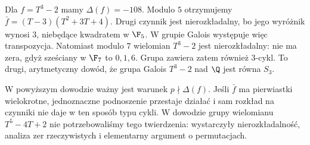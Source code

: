\begin{przyklad}
Dla $f=T^3-2$ mamy $\Delta(f)=-108$. Modulo $5$ otrzymujemy
$\bar f=(T-3)(T^2+3T+4)$. Drugi czynnik jest nierozkładalny, bo jego wyróżnik wynosi $3$, niebędące kwadratem w $\F_5$. W grupie Galois występuje więc transpozycja. Natomiast modulo $7$ wielomian $T^3-2$ jest nierozkładalny: nie ma zera, gdyż sześciany w $\F_7$ to $0,1,6$. Grupa zawiera zatem również $3$-cykl. To drugi, arytmetyczny dowód, że grupa Galois $T^3-2$ nad $\Q$ jest równa $S_3$.
\end{przyklad}

\begin{uwaga}
W powyższym dowodzie ważny jest warunek $p\nmid\Delta(f)$. Jeśli $\bar f$ ma pierwiastki wielokrotne, jednoznaczne podnoszenie przestaje działać i sam rozkład na czynniki nie daje w ten sposób typu cykli. W dowodzie grupy wielomianu $T^5-4T+2$ nie potrzebowaliśmy tego twierdzenia: wystarczyły nierozkładalność, analiza zer rzeczywistych i elementarny argument o permutacjach.
\end{uwaga}


